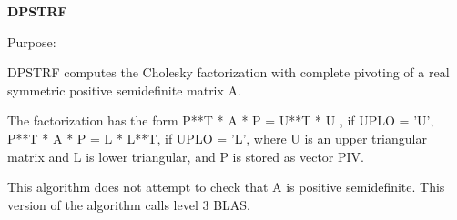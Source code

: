 {\bfseries D\+P\+S\+T\+R\+F} 

 \begin{DoxyParagraph}{Purpose\+: }
\begin{DoxyVerb} DPSTRF computes the Cholesky factorization with complete
 pivoting of a real symmetric positive semidefinite matrix A.

 The factorization has the form
    P**T * A * P = U**T * U ,  if UPLO = 'U',
    P**T * A * P = L  * L**T,  if UPLO = 'L',
 where U is an upper triangular matrix and L is lower triangular, and
 P is stored as vector PIV.

 This algorithm does not attempt to check that A is positive
 semidefinite. This version of the algorithm calls level 3 BLAS.\end{DoxyVerb}
 
\end{DoxyParagraph}

